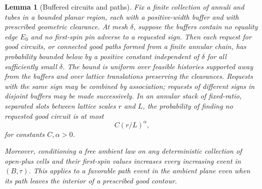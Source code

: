 \documentclass[11pt]{article}
\newtheorem{lemma}[theorem]{Lemma}
\theoremstyle{definition}
\theoremstyle{remark}
\numberwithin{equation}{section}
\begin{document}
\begin{lemma}[Buffered circuits and paths]\label{lem:buffer-circuits}
Fix a finite collection of annuli and tubes in a bounded planar region,
each with a positive-width buffer and with prescribed geometric clearance.
At mesh $\delta$, suppose the buffers contain no equality edge $E_0$ and
no first-spin pin adverse to a requested sign. Then each request for good
circuits, or connected good paths formed from a finite annular chain, has
probability bounded below by a positive constant independent of $\delta$
for all sufficiently small $\delta$. The bound is uniform over feasible
histories supported away from the buffers and over lattice translations
preserving the clearances. Requests with the same sign may be combined by
association; requests of different signs in disjoint buffers may be made
successively. In an annular stack of fixed-ratio, separated slots between
lattice scales $r$ and $L$, the probability of finding no requested good
circuit is at most
\begin{equation}\label{discrete:stack}
 C(r/L)^\alpha,
\end{equation}
for constants $C,\alpha>0$.

Moreover, conditioning a free ambient law on any deterministic collection
of open-plus cells and their first-spin values increases every increasing
event in $(B,\tau)$. This applies to a favorable path event in the ambient
plane even when its path leaves the interior of a prescribed good contour.
\end{lemma}
\end{document}

